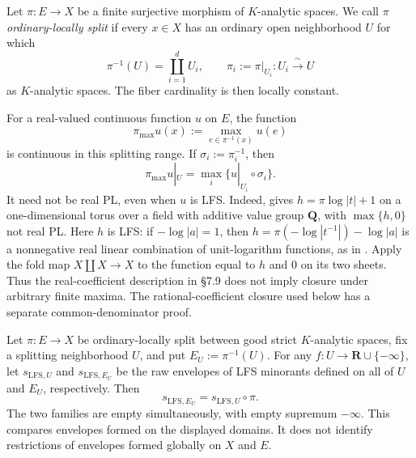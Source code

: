 \begin{definition}
\label{def:p031-ordinary-locally-split}
Let $\pi:E\to X$ be a finite surjective morphism of $K$-analytic spaces.
We call $\pi$ \emph{ordinary-locally split} if every $x\in X$ has an
ordinary open neighborhood $U$ for which
\begin{equation}
\label{eq:p031-ordinary-local-splitting}
 \pi^{-1}(U)=\coprod_{i=1}^{d}U_i,
 \qquad \pi_i:=\pi|_{U_i}:U_i\xrightarrow{\ \sim\ }U
\end{equation}
as $K$-analytic spaces. The fiber cardinality is then locally constant.
\end{definition}

\begin{remark}
\label{thm:p031-lfs-fiber-maximum}
For a real-valued continuous function $u$ on $E$, the function
\begin{equation}
\label{eq:p031-lfs-fiber-maximum}
 \pi_{\max}u(x):=\max_{e\in\pi^{-1}(x)}u(e)
\end{equation}
is continuous in this splitting range. If $\sigma_i:=\pi_i^{-1}$, then
\begin{equation}
\label{eq:p031-local-fiber-maximum}
 \pi_{\max}u|_U=\max_i\{u|_{U_i}\circ\sigma_i\}.
\end{equation}
It need not be real PL, even when $u$ is LFS. Indeed,
\cite[Example~5.3]{GJR26} gives $h=\pi\log|t|+1$ on a one-dimensional
torus over a field with additive value group $\mathbf Q$, with
$\max\{h,0\}$ not real PL. Here $h$ is LFS: if $-\log|a|=1$, then
$h=\pi(-\log|t^{-1}|)-\log|a|$ is a nonnegative real linear combination
of unit-logarithm functions, as in \cite[\S7.9]{GJR26}. Apply the fold map
$X\amalg X\to X$ to the function equal to $h$ and $0$ on its two sheets.
Thus the real-coefficient description in \S7.9 does not imply closure
under arbitrary finite maxima. The rational-coefficient closure used
below has a separate common-denominator proof.
\end{remark}

\begin{theorem}
\label{thm:p031-lfs-envelope-pullback}
Let $\pi:E\to X$ be ordinary-locally split between good strict
$K$-analytic spaces, fix a splitting neighborhood $U$, and put
$E_U:=\pi^{-1}(U)$. For any $f:U\to\mathbf R\cup\{-\infty\}$, let
$s_{\mathrm{LFS},U}$ and $s_{\mathrm{LFS},E_U}$ be the raw envelopes
of LFS minorants defined on all of $U$ and $E_U$, respectively. Then
\begin{equation}
\label{eq:p031-lfs-envelope-pullback}
 s_{\mathrm{LFS},E_U}=s_{\mathrm{LFS},U}\circ\pi.
\end{equation}
The two families are empty simultaneously, with empty supremum $-\infty$.
This compares envelopes formed on the displayed domains. It does not
identify restrictions of envelopes formed globally on $X$ and $E$.
\end{theorem}
